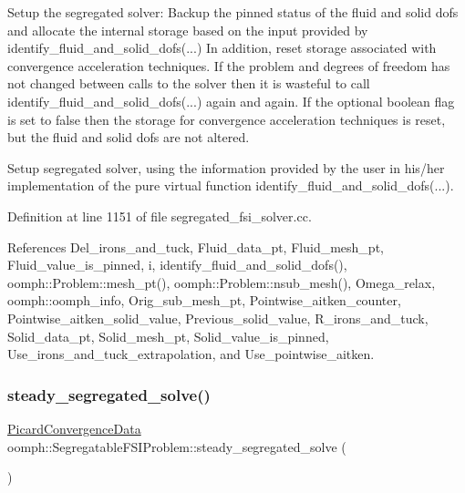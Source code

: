 Setup the segregated solver\+: Backup the pinned status of the fluid and solid dofs and allocate the internal storage based on the input provided by identify\+\_\+fluid\+\_\+and\+\_\+solid\+\_\+dofs(...) In addition, reset storage associated with convergence acceleration techniques. If the problem and degrees of freedom has not changed between calls to the solver then it is wasteful to call identify\+\_\+fluid\+\_\+and\+\_\+solid\+\_\+dofs(...) again and again. If the optional boolean flag is set to false then the storage for convergence acceleration techniques is reset, but the fluid and solid dofs are not altered. 

Setup segregated solver, using the information provided by the user in his/her implementation of the pure virtual function identify\+\_\+fluid\+\_\+and\+\_\+solid\+\_\+dofs(...). 

Definition at line 1151 of file segregated\+\_\+fsi\+\_\+solver.\+cc.



References Del\+\_\+irons\+\_\+and\+\_\+tuck, Fluid\+\_\+data\+\_\+pt, Fluid\+\_\+mesh\+\_\+pt, Fluid\+\_\+value\+\_\+is\+\_\+pinned, i, identify\+\_\+fluid\+\_\+and\+\_\+solid\+\_\+dofs(), oomph\+::\+Problem\+::mesh\+\_\+pt(), oomph\+::\+Problem\+::nsub\+\_\+mesh(), Omega\+\_\+relax, oomph\+::oomph\+\_\+info, Orig\+\_\+sub\+\_\+mesh\+\_\+pt, Pointwise\+\_\+aitken\+\_\+counter, Pointwise\+\_\+aitken\+\_\+solid\+\_\+value, Previous\+\_\+solid\+\_\+value, R\+\_\+irons\+\_\+and\+\_\+tuck, Solid\+\_\+data\+\_\+pt, Solid\+\_\+mesh\+\_\+pt, Solid\+\_\+value\+\_\+is\+\_\+pinned, Use\+\_\+irons\+\_\+and\+\_\+tuck\+\_\+extrapolation, and Use\+\_\+pointwise\+\_\+aitken.

\mbox{\label{classoomph_1_1SegregatableFSIProblem_a8f8145df86358916df505e2b513caf6a}} 
\subsubsection{\texorpdfstring{steady\+\_\+segregated\+\_\+solve()}{steady\_segregated\_solve()}}
{\footnotesize\ttfamily \hyperlink{classoomph_1_1PicardConvergenceData}{Picard\+Convergence\+Data} oomph\+::\+Segregatable\+F\+S\+I\+Problem\+::steady\+\_\+segregated\+\_\+solve (\begin{DoxyParamCaption}{ }\end{DoxyParamCaption})}



